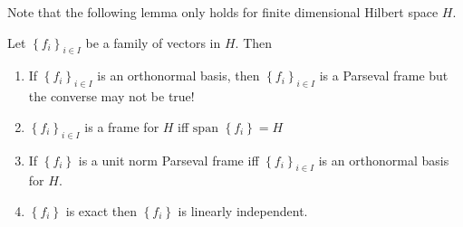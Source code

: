 Note that the following lemma only holds for finite dimensional Hilbert space $H$.

\begin{lemma}
    Let $\left\{ f_i \right\}_{i\in I}$ be a family of vectors in $H$. Then
    \begin{enumerate}[label=(\arabic*)]
	\item If $\left\{ f_i \right\}_{i\in I}$ is an orthonormal basis, then $\left\{ f_i \right\}_{i\in I}$ is a Parseval frame but the converse may not be true!
	\item $\left\{ f_i \right\}_{i\in I}$ is a frame for $H$ iff $\text{span } \left\{ f_i \right\} =H$
	\item If $\left\{ f_i \right\}$ is a unit norm Parseval frame iff $\left\{ f_i \right\}_{i\in I}$ is an orthonormal basis for $H$.
	\item $\left\{ f_i \right\}$ is exact then $\left\{ f_i \right\}$ is linearly independent.
    \end{enumerate}
    \label{lemma:prop-frames}
\end{lemma}

